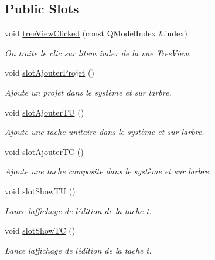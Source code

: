\subsection*{Public Slots}
\begin{DoxyCompactItemize}
\item 
void \hyperlink{class_main_window_a4e6f43d07f77bfa5ef816fdaeddb2f9c}{tree\+View\+Clicked} (const Q\+Model\+Index \&index)
\begin{DoxyCompactList}\small\item\em On traite le clic sur l\textquotesingle{}item index de la vue Tree\+View. \end{DoxyCompactList}\item 
void \hyperlink{class_main_window_a9221bf94c502faa7f0cb55835dc4f576}{slot\+Ajouter\+Projet} ()
\begin{DoxyCompactList}\small\item\em Ajoute un projet dans le système et sur l\textquotesingle{}arbre. \end{DoxyCompactList}\item 
void \hyperlink{class_main_window_addf6fb45b7869279d5c7b746dfe61429}{slot\+Ajouter\+T\+U} ()
\begin{DoxyCompactList}\small\item\em Ajoute une tache unitaire dans le système et sur l\textquotesingle{}arbre. \end{DoxyCompactList}\item 
void \hyperlink{class_main_window_a4201a4ae86be39f54071eedb95af8291}{slot\+Ajouter\+T\+C} ()
\begin{DoxyCompactList}\small\item\em Ajoute une tache composite dans le système et sur l\textquotesingle{}arbre. \end{DoxyCompactList}\item 
void \hyperlink{class_main_window_a2022b216fafd6461b8b959e791fee853}{slot\+Show\+T\+U} ()
\begin{DoxyCompactList}\small\item\em Lance l\textquotesingle{}affichage de l\textquotesingle{}édition de la tache t. \end{DoxyCompactList}\item 
void \hyperlink{class_main_window_a72cb9533595d3347763e3e485ac01fd6}{slot\+Show\+T\+C} ()
\begin{DoxyCompactList}\small\item\em Lance l\textquotesingle{}affichage de l\textquotesingle{}édition de la tache t. \end{DoxyCompactList}\item 

\end{DoxyCompactItemize}
